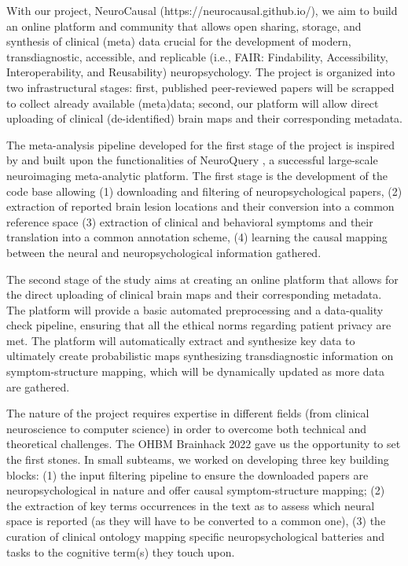 \documentclass[../main.tex]{subfiles}
\begin{document}
With our project, NeuroCausal (https://neurocausal.github.io/), we aim to build an online platform and community that allows open sharing, storage, and synthesis of clinical (meta) data crucial for the development of modern, transdiagnostic, accessible, and replicable (i.e., FAIR: Findability, Accessibility, Interoperability, and Reusability) neuropsychology. The project is organized into two infrastructural stages: first, published peer-reviewed papers will be scrapped to collect already available (meta)data; second, our platform will allow direct uploading of clinical (de-identified) brain maps and their corresponding metadata. 

The meta-analysis pipeline developed for the first stage of the project is inspired by and built upon the functionalities of NeuroQuery \parencite{dockes_neuroquery_2020}, a successful large-scale neuroimaging meta-analytic platform. The first stage is the development of the code base allowing (1) downloading and filtering of neuropsychological papers, (2) extraction of reported brain lesion locations and their conversion into a common reference space (3) extraction of clinical and behavioral symptoms and their translation into a common annotation scheme, (4) learning the causal mapping between the neural and neuropsychological information gathered.

The second stage of the study aims at creating an online platform that allows for the direct uploading of clinical brain maps and their corresponding metadata. The platform will provide a basic automated preprocessing and a data-quality check pipeline, ensuring that all the ethical norms regarding patient privacy are met. The platform will automatically extract and synthesize key data to ultimately create probabilistic maps synthesizing transdiagnostic information on symptom-structure mapping, which will be dynamically updated as more data are gathered.

The nature of the project requires expertise in different fields (from clinical neuroscience to computer science) in order to overcome both technical and theoretical challenges. The OHBM Brainhack 2022 gave us the opportunity to set the first stones. In small subteams, we worked on developing three key building blocks: (1) the input filtering pipeline to ensure the downloaded papers are neuropsychological in nature and offer causal symptom-structure mapping; (2) the extraction of key terms occurrences in the text as to assess which neural space is reported (as they will have to be converted to a common one), (3) the curation of clinical ontology mapping specific neuropsychological batteries and tasks to the cognitive term(s) they touch upon.
\end{document}
